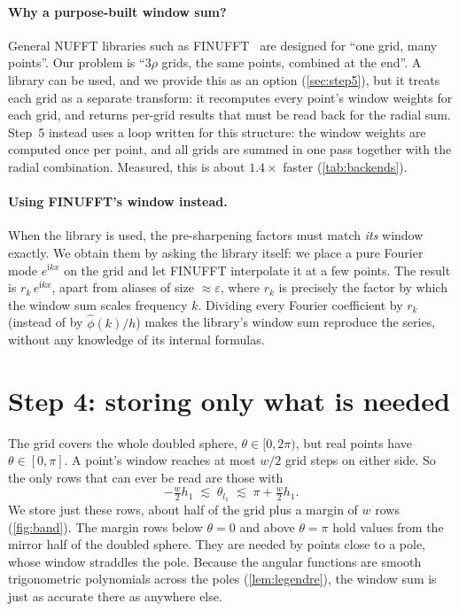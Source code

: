 \documentclass[11pt,a4paper]{article}
\theoremstyle{definition}
\newcommand{\eps}{\varepsilon}
\newcommand{\ii}{\mathrm{i}}
\begin{document}
\paragraph{Why a purpose-built window sum?} General NUFFT libraries such as FINUFFT~\cite{barnett2019} are designed for ``one grid, many points''.
Our problem is ``$3\rho$ grids, the same points, combined at the end''. A library can be used, and we provide this as an option (\cref{sec:step5}),
but it treats each grid as a separate transform: it recomputes every point's window weights for each grid, and returns per-grid results that must be
read back for the radial sum. Step~5 instead uses a loop written for this structure: the window weights are computed once per point, and all grids
are summed in one pass together with the radial combination. Measured, this is about $1.4\times$ faster (\cref{tab:backends}).

\paragraph{Using FINUFFT's window instead.} When the library is used, the pre-sharpening factors must match \emph{its} window exactly. We obtain them by
asking the library itself: we place a pure Fourier mode $e^{\ii kx}$ on the grid and let FINUFFT interpolate it at a few points. The result is
$r_k\,e^{\ii kx}$, apart from aliases of size $\approx\eps$, where $r_k$ is precisely the factor by which the window sum scales frequency $k$. Dividing
every Fourier coefficient by $r_k$ (instead of by $\hat\phi(k)/h$) makes the library's window sum reproduce the series, without any knowledge of its
internal formulas.

\section{Step 4: storing only what is needed}\label{sec:half}\label{sec:step4}

The grid covers the whole doubled sphere, $\theta\in[0,2\pi)$, but real points have $\theta\in[0,\pi]$. A point's window
reaches at most $w/2$ grid steps on either side. So the only rows that can ever be read are those with
\begin{equation}
-\tfrac w2h_1\;\lesssim\;\theta_{l_1}\;\lesssim\;\pi+\tfrac w2h_1 .
\end{equation}
We store just these rows, about half of the grid plus a margin of $w$ rows (\cref{fig:band}). The margin rows below
$\theta=0$ and above $\theta=\pi$ hold values from the mirror half of the doubled sphere. They are needed by points close to a pole,
whose window straddles the pole. Because the angular functions are smooth trigonometric polynomials across the poles (\cref{lem:legendre}),
the window sum is just as accurate there as anywhere else.
\end{document}
